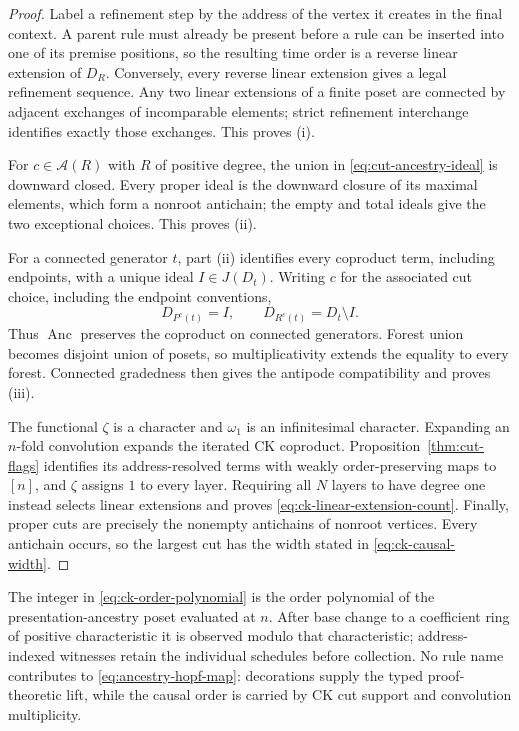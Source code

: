\documentclass[10pt,a4paper]{article}
\theoremstyle{plain}
\theoremstyle{definition}
\theoremstyle{remark}
\begin{document}
\begin{proof}
Label a refinement step by the address of the vertex it creates in the
final context.  A parent rule must already be present before a rule can be
inserted into one of its premise positions, so the resulting time order is
a reverse linear extension of \(D_R\).  Conversely, every reverse linear
extension gives a legal refinement sequence.  Any two linear extensions of
a finite poset are connected by adjacent exchanges of incomparable
elements; strict refinement interchange identifies exactly those exchanges.
This proves (i).

For \(c\in\mathcal A(R)\) with \(R\) of positive degree, the union in
\eqref{eq:cut-ancestry-ideal} is downward
closed.  Every proper ideal is the downward closure of its maximal
elements, which form a nonroot antichain; the empty and total ideals give
the two exceptional choices.  This proves (ii).

For a connected generator \(t\), part (ii) identifies every coproduct term,
including endpoints, with a unique ideal \(I\in J(D_t)\).  Writing \(c\)
for the associated cut choice, including the endpoint conventions,
\[
 D_{P^c(t)}=I,
 \qquad
 D_{R^c(t)}=D_t\setminus I.
\]
Thus \(\operatorname{Anc}\) preserves the coproduct on connected
generators.  Forest union becomes disjoint union of posets, so
multiplicativity extends the equality to every forest.  Connected
gradedness then gives the antipode compatibility and proves (iii).

The functional \(\zeta\) is a character and \(\omega_1\) is an
infinitesimal character.  Expanding an \(n\)-fold convolution expands the
iterated CK coproduct.  Proposition~\ref{thm:cut-flags} identifies its
address-resolved terms with weakly order-preserving maps to \([n]\), and
\(\zeta\) assigns \(1\) to every layer.  Requiring all \(N\) layers to have
degree one instead selects linear extensions and proves
\eqref{eq:ck-linear-extension-count}.  Finally, proper cuts are precisely
the nonempty antichains of nonroot vertices.  Every antichain occurs, so
the largest cut has the width stated in \eqref{eq:ck-causal-width}.
\end{proof}

The integer in \eqref{eq:ck-order-polynomial} is the order polynomial of
the presentation-ancestry poset evaluated at \(n\).  After base change to a
coefficient ring of positive characteristic it is observed modulo that
characteristic; address-indexed witnesses retain the individual schedules
before collection.  No rule name contributes to
\eqref{eq:ancestry-hopf-map}: decorations supply the typed proof-theoretic
lift, while the causal order is carried by CK cut support and convolution
multiplicity.
\end{document}
